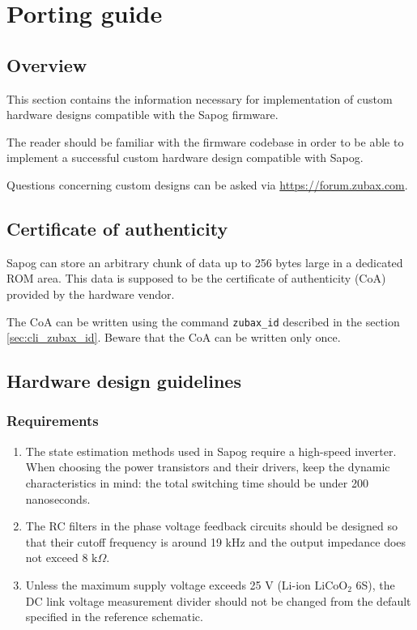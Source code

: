 \documentclass{zubaxdoc}
\begin{document}
\chapter{Porting guide}\label{sec:porting_guide}

\section{Overview}

This section contains the information necessary for implementation of custom hardware designs compatible with the
Sapog firmware.

The reader should be familiar with the firmware codebase in order to be able to implement a successful
custom hardware design compatible with Sapog.

Questions concerning custom designs can be asked via \url{https://forum.zubax.com}.

\section{Certificate of authenticity}

Sapog can store an arbitrary chunk of data up to 256 bytes large in a dedicated ROM area.
This data is supposed to be the certificate of authenticity (CoA) provided by the hardware vendor.

The CoA can be written using the command \verb|zubax_id| described in the section
\ref{sec:cli_zubax_id}.
Beware that the CoA can be written only once.

\section{Hardware design guidelines}

\subsection{Requirements}

\begin{enumerate}
    \item The state estimation methods used in Sapog require a high-speed inverter.
    When choosing the power transistors and their drivers, keep the dynamic characteristics in mind:
    the total switching time should be under 200 nanoseconds.
    
    \item The RC filters in the phase voltage feedback circuits should be designed so that their cutoff frequency
    is around 19 kHz and the output impedance does not exceed 8 $\text{k}\Omega$.
    
    \item Unless the maximum supply voltage exceeds 25 V (Li-ion $\text{LiCoO}_2$ 6S),
    the DC link voltage measurement divider should not be changed from the default specified in
    the reference schematic.
\end{enumerate}
\end{document}
